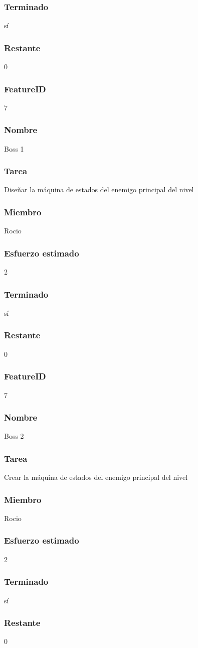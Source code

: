 \subsubsection{Terminado} sí
\subsubsection{Restante} 0

\subsubsection{FeatureID} 7
\subsubsection{Nombre} Boss 1
\subsubsection{Tarea} Diseñar la máquina de estados del enemigo principal del nivel
\subsubsection{Miembro} Rocio
\subsubsection{Esfuerzo estimado} 2
\subsubsection{Terminado} sí
\subsubsection{Restante} 0

\subsubsection{FeatureID} 7
\subsubsection{Nombre} Boss 2
\subsubsection{Tarea} Crear la máquina de estados del enemigo principal del nivel
\subsubsection{Miembro} Rocio
\subsubsection{Esfuerzo estimado} 2
\subsubsection{Terminado} sí
\subsubsection{Restante} 0
